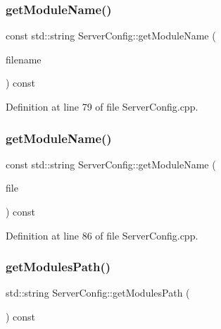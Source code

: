 \subsubsection{\texorpdfstring{get\+Module\+Name()}{getModuleName()}\hspace{0.1cm}{\footnotesize\ttfamily [1/2]}}
{\footnotesize\ttfamily const std\+::string Server\+Config\+::get\+Module\+Name (\begin{DoxyParamCaption}\item[{const std\+::string \&}]{filename }\end{DoxyParamCaption}) const}



Definition at line 79 of file Server\+Config.\+cpp.

\mbox{\label{class_zia_1_1_server_config_a090ae222eeed278436a1fba19f5dcd6c}} 
\subsubsection{\texorpdfstring{get\+Module\+Name()}{getModuleName()}\hspace{0.1cm}{\footnotesize\ttfamily [2/2]}}
{\footnotesize\ttfamily const std\+::string Server\+Config\+::get\+Module\+Name (\begin{DoxyParamCaption}\item[{const \hyperlink{namespacecfg_af0aed6e47bd26e91ad7d69467f96caaf}{File\+Descriptor} \&}]{file }\end{DoxyParamCaption}) const}



Definition at line 86 of file Server\+Config.\+cpp.

\mbox{\label{class_zia_1_1_server_config_ae55e57b14d9efafcbecc23bf5b8d3957}} 
\subsubsection{\texorpdfstring{get\+Modules\+Path()}{getModulesPath()}}
{\footnotesize\ttfamily std\+::string Server\+Config\+::get\+Modules\+Path (\begin{DoxyParamCaption}{ }\end{DoxyParamCaption}) const\hspace{0.3cm}{\ttfamily [noexcept]}}



